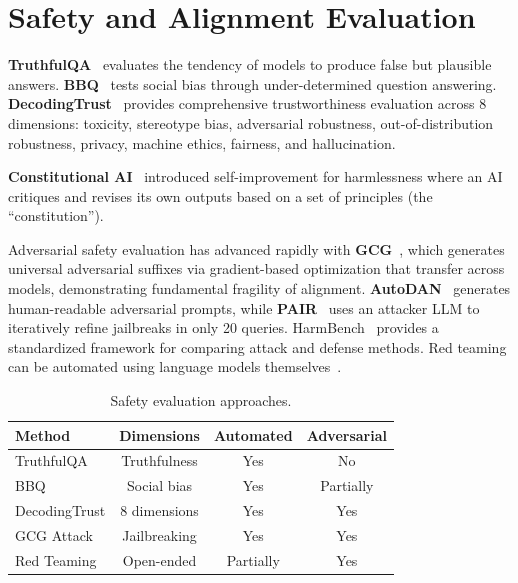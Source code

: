 \documentclass[11pt]{article}
\begin{document}
\section{Safety and Alignment Evaluation}
\label{sec:safety}

\textbf{TruthfulQA}~\cite{lin2022truthfulqa} evaluates the tendency of models to produce false but plausible answers. \textbf{BBQ}~\cite{parrish2022bbq} tests social bias through under-determined question answering. \textbf{DecodingTrust}~\cite{wang2023decodingtrust} provides comprehensive trustworthiness evaluation across 8 dimensions: toxicity, stereotype bias, adversarial robustness, out-of-distribution robustness, privacy, machine ethics, fairness, and hallucination.

\textbf{Constitutional AI}~\cite{bai2022constitutional} introduced self-improvement for harmlessness where an AI critiques and revises its own outputs based on a set of principles (the ``constitution'').

Adversarial safety evaluation has advanced rapidly with \textbf{GCG}~\cite{zou2023universal}, which generates universal adversarial suffixes via gradient-based optimization that transfer across models, demonstrating fundamental fragility of alignment. \textbf{AutoDAN}~\cite{zhu2023autodan} generates human-readable adversarial prompts, while \textbf{PAIR}~\cite{chao2024pair} uses an attacker LLM to iteratively refine jailbreaks in only 20 queries. HarmBench~\cite{mazeika2024harmbench} provides a standardized framework for comparing attack and defense methods. Red teaming can be automated using language models themselves~\cite{perez2022redteaming}.

\begin{table}[h]
\centering
\caption{Safety evaluation approaches.}
\small
\begin{tabular}{@{}lccc@{}}
\toprule
\textbf{Method} & \textbf{Dimensions} & \textbf{Automated} & \textbf{Adversarial} \\
\midrule
TruthfulQA & Truthfulness & Yes & No \\
BBQ & Social bias & Yes & Partially \\
DecodingTrust & 8 dimensions & Yes & Yes \\
GCG Attack & Jailbreaking & Yes & Yes \\
Red Teaming & Open-ended & Partially & Yes \\
\bottomrule
\end{tabular}
\end{table}
\end{document}
